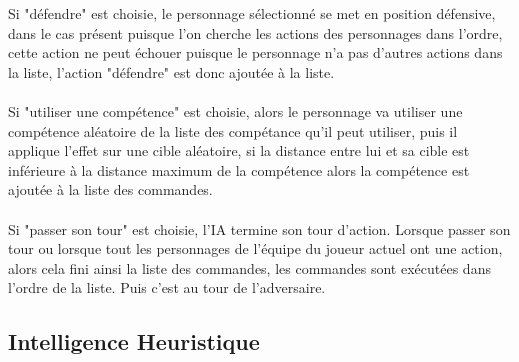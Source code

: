 Si "défendre" est choisie, le personnage sélectionné se met en 
position défensive, dans le cas présent puisque l'on cherche les 
actions des personnages dans l'ordre, cette action ne peut échouer 
puisque le personnage n'a pas d'autres actions dans la liste, 
l'action "défendre" est donc ajoutée à la liste.
\\\\
Si "utiliser une compétence" est choisie, alors le personnage va 
utiliser une compétence aléatoire de la liste des compétance qu'il 
peut utiliser, puis il applique l'effet sur une cible aléatoire, si 
la distance entre lui et sa cible est inférieure à la distance 
maximum de la compétence alors la compétence est ajoutée à la liste 
des commandes.
\\\\
Si "passer son tour" est choisie, l'IA termine son tour d’action.
Lorsque passer son tour ou lorsque tout les personnages de l'équipe 
du joueur actuel ont une action, alors cela fini ainsi la liste des 
commandes, les commandes sont exécutées dans l'ordre de la liste. 
Puis c'est au tour de l'adversaire.
\\

\subsection{Intelligence Heuristique}

